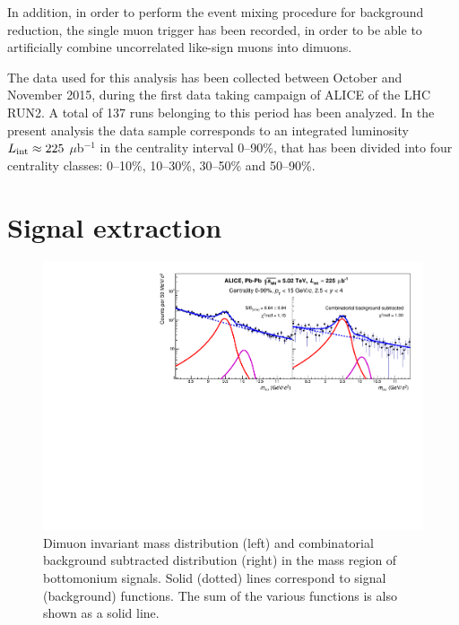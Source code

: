 In addition, in order to perform the event mixing procedure for background reduction, the single muon trigger has been recorded, in order to be able to artificially combine uncorrelated like-sign muons into dimuons.

The data used for this analysis has been collected between October and November 2015, during the first \pbpb data taking campaign of ALICE of the  LHC RUN2.
A total of 137 runs belonging to this period has been analyzed.
In the present analysis the data sample corresponds to an integrated luminosity $L_{\rm int}\approx 225$ $\mu$b$^{-1}$ in the centrality interval 0--90\%, that has been divided into four centrality classes: 0--10\%, 10--30\%, 30--50\% and 50--90\%.

\section{Signal extraction}

\begin{figure}[!b]
\begin{center}
\includegraphics[width=0.8\linewidth]{Chapters/Analysis/Figs/InvMass_Upsilon_Performance_Ylog.pdf}
\caption{Dimuon invariant mass distribution (left) and combinatorial background subtracted distribution (right) in the mass region of bottomonium signals. Solid (dotted) lines correspond to signal (background) functions. The sum of the various functions is also shown as a solid line.}
\label{fig:mass_dist}
\end{center}
\end{figure}

